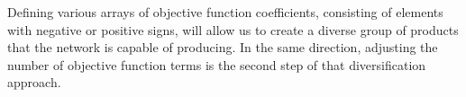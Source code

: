 Defining various arrays of objective function coefficients, consisting of elements with negative or positive signs, will allow us to create a diverse group of products that the network is capable of producing. In the same direction, adjusting the number of objective function terms is the second step of that diversification approach.